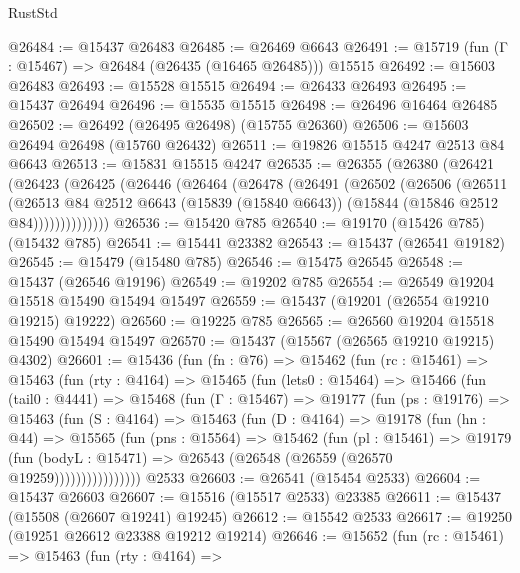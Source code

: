 \begin{lexlean}{RustStd}
\begin{coremodule}
@26484 := @15437 @26483
@26485 := @26469 @6643
@26491 := @15719 (fun (Γ : @15467) => @26484 (@26435 (@16465 @26485))) @15515
@26492 := @15603 @26483
@26493 := @15528 @15515
@26494 := @26433 @26493
@26495 := @15437 @26494
@26496 := @15535 @15515
@26498 := @26496 @16464 @26485
@26502 := @26492 (@26495 @26498) (@15755 @26360)
@26506 := @15603 @26494 @26498 (@15760 @26432)
@26511 := @19826 @15515 @4247 @2513 @84 @6643
@26513 := @15831 @15515 @4247
@26535 := @26355
    (@26380
      (@26421
        (@26423
          (@26425
            (@26446
              (@26464
                (@26478
                  (@26491
                    (@26502
                      (@26506
                        (@26511
                          (@26513
                            @84
                            @2512
                            @6643
                            (@15839 (@15840 @6643))
                            (@15844 (@15846 @2512 @84))))))))))))))
@26536 := @15420 @785
@26540 := @19170 (@15426 @785) (@15432 @785)
@26541 := @15441 @23382
@26543 := @15437 (@26541 @19182)
@26545 := @15479 (@15480 @785)
@26546 := @15475 @26545
@26548 := @15437 (@26546 @19196)
@26549 := @19202 @785
@26554 := @26549 @19204 @15518 @15490 @15494 @15497
@26559 := @15437 (@19201 (@26554 @19210 @19215) @19222)
@26560 := @19225 @785
@26565 := @26560 @19204 @15518 @15490 @15494 @15497
@26570 := @15437 (@15567 (@26565 @19210 @19215) @4302)
@26601 := @15436
    (fun (fn : @76) =>
    @15462
      (fun (rc : @15461) =>
      @15463
        (fun (rty : @4164) =>
        @15465
          (fun (lets0 : @15464) =>
          @15466
            (fun (tail0 : @4441) =>
            @15468
              (fun (Γ : @15467) =>
              @19177
                (fun (ps : @19176) =>
                @15463
                  (fun (S : @4164) =>
                  @15463
                    (fun (D : @4164) =>
                    @19178
                      (fun (hn : @44) =>
                      @15565
                        (fun (pns : @15564) =>
                        @15462
                          (fun (pl : @15461) =>
                          @19179
                            (fun (bodyL : @15471) =>
                            @26543 (@26548 (@26559 (@26570 @19259))))))))))))))))
    @2533
@26603 := @26541 (@15454 @2533)
@26604 := @15437 @26603
@26607 := @15516 (@15517 @2533) @23385
@26611 := @15437 (@15508 (@26607 @19241) @19245)
@26612 := @15542 @2533
@26617 := @19250 (@19251 @26612 @23388 @19212 @19214)
@26646 := @15652
    (fun (rc : @15461) =>
    @15463
      (fun (rty : @4164) =>

\end{coremodule}
\end{lexlean}
